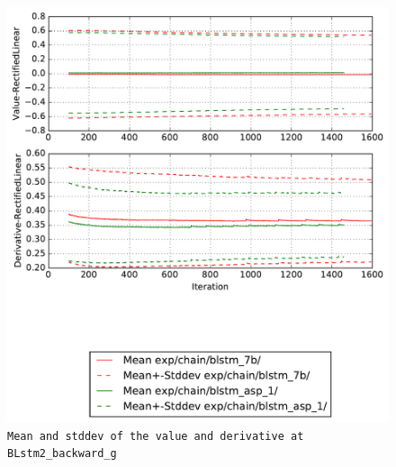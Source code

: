 \documentclass[prl,10pt,twocolumn]{revtex4}
\begin{document}
\newpage
\begin{figure}[h]
  \begin{center}
    \caption{\texttt{Mean and stddev of the value and derivative at BLstm2\_backward\_g}}
    \includegraphics[width=\textwidth]{exp/chain/blstm_7b/report/nonlinstats_BLstm2_backward_g.pdf}
  \end{center}
\end{figure}
\clearpage
\end{document}
